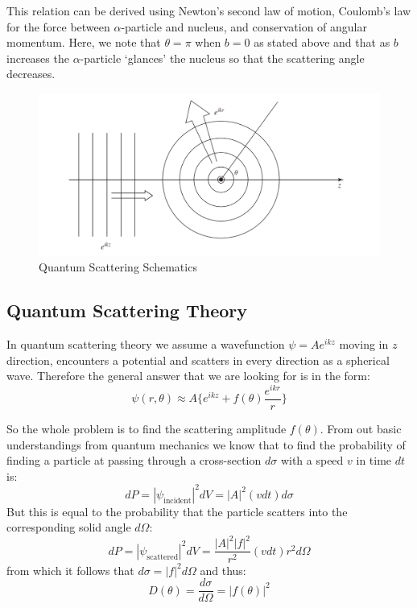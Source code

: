 \documentclass[10pt,a4paper]{report}
\begin{document}
\begin{}
				This relation can be derived using Newton’s second law of motion, Coulomb’s law for the force between $\alpha$-particle and nucleus, and conservation of angular momentum. Here, we note that $\theta=\pi$ when $b=0$ as stated above and that as $b$ increases the $\alpha$-particle ‘glances’ the nucleus so that the scattering angle decreases.
							\begin{figure}
  				\includegraphics[width=\linewidth]{./images/Scattering1.png}
  				\caption{Quantum Scattering Schematics}
  				\label{fig:A Schematic of Quantum Scattering}
			\end{figure}
							
			\subsection{Quantum Scattering Theory}
			In quantum scattering theory we assume a wavefunction $\psi  = Ae^{ikz}$ moving in $z$ direction, encounters a potential and scatters in every direction as a spherical wave. Therefore the general answer that we are looking for is in the form:
			\begin{equation} 
			\psi(r,\theta) \approx A\bigg\{e^{ikz}+f(\theta)\frac{e^{ikr}}{r}\bigg\}
			\end{equation}

			So the whole problem is to find the scattering amplitude $f(\theta)$.  From out basic understandings from quantum mechanics we know that to find the probability of finding a particle at passing through a cross-section $d\sigma$ with a speed $v$ in time $dt$ is:
			$$
			dP =  |\psi_{\text{incident}}|^2 dV = |A|^2(v dt)d\sigma
			$$
			But this is equal to the probability that the particle scatters into the corresponding solid angle $d\Omega$:
			$$
			dP =|\psi_{\text{scattered}}|^2 dV = \frac{|A|^2|f|^2}{r^2}(vdt)r^2d\Omega
			$$
			from which it follows that $ d\sigma = |f|^2 d\Omega$ and thus:
			\begin{equation}
			D(\theta) = \frac{d\sigma}{d\Omega} = |f(\theta)|^2
			\end{equation}
			\begin{quotation}


\end{quotation}
\end{}
\end{document}
